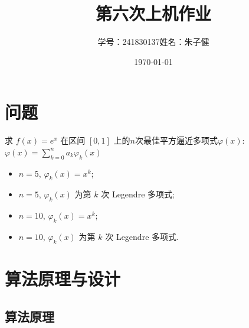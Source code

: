 \documentclass{article}
\title{第六次上机作业}
\author{学号：241830137\quad 姓名：朱子健}
\date{\today}
\begin{document}
\maketitle

\section{问题}
求 $f(x) = e^{x}$ 在区间 $[0,1]$ 上的$n$次最佳平方逼近多项式$\varphi(x)$:
\(
\varphi(x) = \sum_{k=0}^{n} a_k \varphi_k(x)
\)
\begin{itemize}
    \item $n = 5$, $\varphi_k(x) = x^k$;
    \item $n = 5$, $\varphi_k(x)$ 为第 $k$ 次 Legendre 多项式;
    \item $n = 10$, $\varphi_k(x) = x^k$;
    \item $n = 10$, $\varphi_k(x)$ 为第 $k$ 次 Legendre 多项式.
\end{itemize}

\section{算法原理与设计}
\subsection{算法原理}
\end{document}
